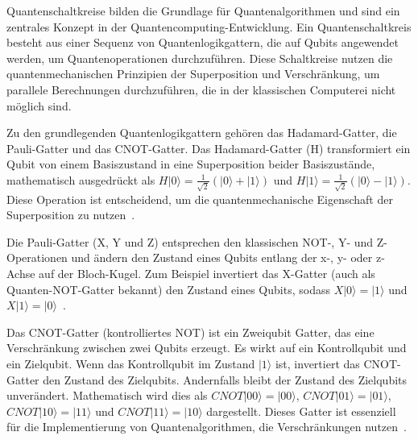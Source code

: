 


Quantenschaltkreise bilden die Grundlage für Quantenalgorithmen und sind ein zentrales Konzept in der 
Quantencomputing-Entwicklung. Ein Quantenschaltkreis besteht aus einer Sequenz von Quantenlogikgattern, 
die auf Qubits angewendet werden, um Quantenoperationen durchzuführen. Diese Schaltkreise nutzen die 
quantenmechanischen Prinzipien der Superposition und Verschränkung, um parallele Berechnungen durchzuführen, 
die in der klassischen Computerei nicht möglich sind.


Zu den grundlegenden Quantenlogikgattern gehören das Hadamard-Gatter, die Pauli-Gatter und das CNOT-Gatter. 
Das Hadamard-Gatter (H) transformiert ein Qubit von einem Basiszustand in eine Superposition beider 
Basiszustände, mathematisch ausgedrückt als \( H|0\rangle = \frac{1}{\sqrt{2}}(|0\rangle + |1\rangle) \) 
und \( H|1\rangle = \frac{1}{\sqrt{2}}(|0\rangle - |1\rangle) \). Diese Operation ist entscheidend, um 
die quantenmechanische Eigenschaft der Superposition zu nutzen~\cite{griffiths2018introduction}.

Die Pauli-Gatter (X, Y und Z) entsprechen den klassischen NOT-, Y- und Z-Operationen und ändern den 
Zustand eines Qubits entlang der x-, y- oder z-Achse auf der Bloch-Kugel. Zum Beispiel invertiert 
das X-Gatter (auch als Quanten-NOT-Gatter bekannt) den Zustand eines Qubits, 
sodass \( X|0\rangle = |1\rangle \) und \( X|1\rangle = |0\rangle \)~\cite{nielsen2010quantum}.

Das CNOT-Gatter (kontrolliertes NOT) ist ein Zweiqubit Gatter, das eine Verschränkung 
zwischen zwei Qubits erzeugt. Es wirkt auf ein Kontrollqubit und ein Zielqubit. Wenn das Kontrollqubit 
im Zustand \(|1\rangle\) ist, invertiert das CNOT-Gatter den Zustand des Zielqubits. Andernfalls bleibt 
der Zustand des Zielqubits unverändert. 
Mathematisch wird dies als \( CNOT|00\rangle = |00\rangle \), \( CNOT|01\rangle = |01\rangle \), \( CNOT|10\rangle = |11\rangle \) 
und \( CNOT|11\rangle = |10\rangle \) dargestellt. Dieses Gatter ist essenziell für die Implementierung von 
Quantenalgorithmen, die Verschränkungen nutzen~\cite{feynman2018simulating}.

